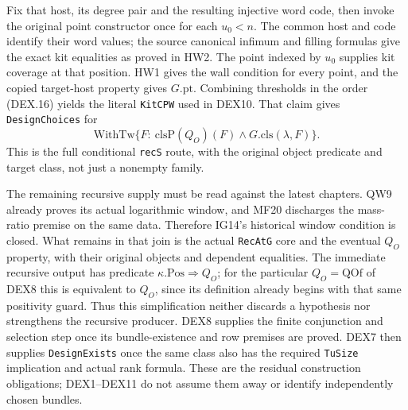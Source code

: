 \documentclass[11pt,a4paper]{article}
\numberwithin{equation}{section}
\theoremstyle{remark}\newtheorem{remark}[theorem]{Remark}
\begin{document}
Fix that host, its degree pair and the resulting injective word code, then
invoke the original point constructor once for each $u_0<n$.
The common host and code identify their word values; the source
canonical infimum and filling formulas give the exact kit equalities
as proved in HW2. The point indexed by $u_0$ supplies kit coverage
at that position. HW1 gives the wall condition for every point,
and the copied target-host property gives $G.\mathrm{pt}$.
Combining thresholds in the order (DEX.16) yields the literal
\texttt{KitCPW} used in DEX10. That claim gives
\texttt{DesignChoices} for
\[
 \mathrm{WithTw}\{F:\ \mathrm{clsP}(Q_O)(F)
                                  \wedge G.\mathrm{cls}(\lambda,F)\}.
                                                               \tag{DEX.20}
\]
This is the full conditional \texttt{recS} route, with the original
object predicate and target class, not just a nonempty family.

The remaining recursive supply must be read against the latest
chapters. QW9 already proves its actual logarithmic window, and
MF20 discharges the mass-ratio premise on the same data. Therefore
IG14's historical window condition is closed. What remains in
that join is the actual \texttt{RecAtG} core and the eventual
$Q_O$ property, with their original objects and dependent equalities.
The immediate recursive output has predicate
$\kappa.\mathrm{Pos}\Rightarrow Q_O$; for the particular
$Q_O=\mathrm{QOf}$ of DEX8 this is equivalent to $Q_O$, since
its definition already begins with that same positivity guard.
Thus this simplification neither discards a hypothesis nor strengthens
the recursive producer.
DEX8 supplies the finite conjunction and selection step once its
bundle-existence and row premises are proved. DEX7 then supplies
\texttt{DesignExists} once the same class also has the required
\texttt{TuSize} implication and actual rank formula. These are
the residual construction obligations; DEX1--DEX11 do not assume
them away or identify independently chosen bundles.
\end{document}
